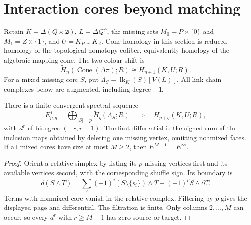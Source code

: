 \section{Interaction cores beyond matching}
\label{sec:interaction-cores}

Retain $K=\Delta(Q\times\mathbf 2)$, $L=\Delta Q^\psi$, the missing
sets $M_0=P\times\{0\}$ and $M_1=Z\times\{1\}$, and
$U=K_P\cup K_Z$.  Cone homology in this section is reduced homology
of the topological homotopy cofiber, equivalently homology of the algebraic
mapping cone.  The two-colour shift is
\[
 \widetilde H_n(\operatorname{Cone}(\Delta\pi);R)
 \cong H_{n+1}(K,U;R).
\]
For a mixed missing core $S$, put
$\Lambda_S=\operatorname{lk}_K(S)[V(L)]$.
All link chain complexes below are augmented, including degree $-1$.

\begin{proposition}
\label{prop:interaction-ss}
There is a finite convergent spectral sequence
\[
 E^1_{p,q}=\bigoplus_{|S|=p}\widetilde H_q(\Lambda_S;R)
 \quad\Longrightarrow\quad H_{p+q}(K,U;R),
\]
with $d^r$ of bidegree $(-r,r-1)$.  The first differential is the
signed sum of the inclusion maps obtained by deleting one missing vertex,
omitting nonmixed faces.  If all mixed cores have size at most $M\ge2$,
then $E^{M-1}=E^\infty$.
\end{proposition}
\begin{proof}
Orient a relative simplex by listing its $p$ missing vertices first and
its available vertices second, with the corresponding shuffle sign.
Its boundary is
\[
 d(S\wedge T)=\sum_i(-1)^i(S\setminus\{s_i\})\wedge T
                 +(-1)^pS\wedge\partial T.
\]
Terms with nonmixed core vanish in the relative complex.  Filtering by
$p$ gives the displayed page and differential.  The filtration is finite.
Only columns $2,\ldots,M$ can occur, so every $d^r$ with $r\ge M-1$
has zero source or target.
\end{proof}

